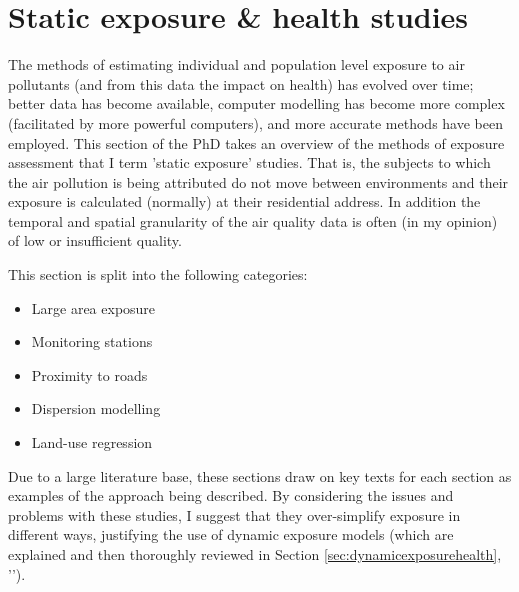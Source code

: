 
\newpage

\section{Static exposure \& health studies}
\label{sec:staticexposurehealth}

The methods of estimating individual and population level exposure to air pollutants (and from this data the impact on health) has evolved over time; better data has become available, computer modelling has become more complex (facilitated by more powerful computers), and more accurate methods have been employed. This section of the PhD takes an overview of the methods of exposure assessment that I term 'static exposure' studies. That is, the subjects to which the air pollution is being attributed do not move between environments and their exposure is calculated (normally) at their residential address. In addition the temporal and spatial granularity of the air quality data is often (in my opinion) of low or insufficient quality.

This section is split into the following categories:

\begin{itemize}
\item Large area exposure
\item Monitoring stations
\item Proximity to roads
\item Dispersion modelling
\item Land-use regression
\end{itemize}

Due to a large literature base, these sections draw on key texts for each section as examples of the approach being described. By considering the issues and problems with these studies, I suggest that they over-simplify exposure in different ways, justifying the use of dynamic exposure models (which are explained and then thoroughly reviewed in Section \ref{sec:dynamicexposurehealth}, '').


